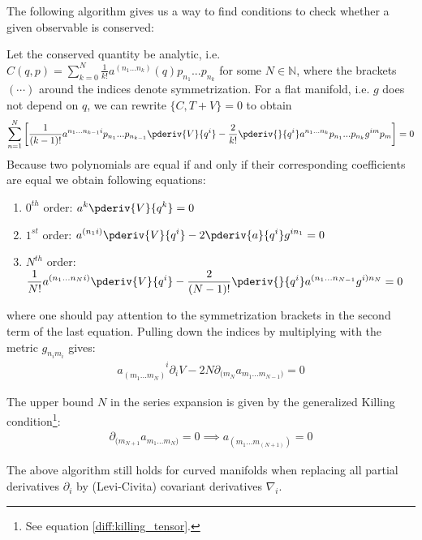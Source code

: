	
	The following algorithm gives us a way to find conditions to check whether a given observable is conserved:
	\begin{method}
		Let the conserved quantity be analytic, i.e. $C(q, p) = \sum_{k=0}^N\frac{1}{k!}a^{(n_1...n_k)}(q)p_{n_1}...p_{n_k}$ for some $N\in\mathbb{N}$, where the brackets $(\cdots)$ around the indices denote symmetrization. For a flat manifold, i.e. $g$ does not depend on $q$, we can rewrite $\{C, T+V\} = 0$ to obtain
		\[
			\sum_{n = 1}^N\left[\frac{1}{(k-1)!}a^{n_1...n_{k-1}i}p_{n_1}...p_{n_{k-1}}\pderiv{V}{q^i} - \frac{2}{k!}\pderiv{}{q^i}a^{n_1...n_k}p_{n_1}...p_{n_k}g^{im}p_m\right] = 0
		\]
		Because two polynomials are equal if and only if their corresponding coefficients are equal we obtain following equations:
		\begin{enumerate}
			\item $0^{th}$ order: $\displaystyle a^k\pderiv{V}{q^k} = 0$
			\item $1^{st}$ order: $\displaystyle a^{(n_1i)}\pderiv{V}{q^i} - 2\pderiv{a}{q^i}g^{in_1} = 0$
			\item $N^{th}$ order: $\displaystyle \frac{1}{N!}a^{(n_1...n_Ni)}\pderiv{V}{q^i} - \frac{2}{(N-1)!}\pderiv{}{q^i}a^{(n_1...n_{N-1}}g^{i)n_N} = 0$
		\end{enumerate}
		where one should pay attention to the symmetrization brackets in the second term of the last equation. Pulling down the indices by multiplying with the metric $g_{n_im_i}$ gives:
		\begin{gather}
			a_{(m_1...m_N)}^{\phantom{(m_1...m_N)}i}\partial_iV - 2N\partial_{(m_N}a_{m_1...m_{N-1})} = 0
		\end{gather}
		
		The upper bound $N$ in the series expansion is given by the generalized Killing condition\footnote{See equation \ref{diff:killing_tensor}.}:
		\begin{gather}
			\partial_{(m_{N+1}}a_{m_1...m_N)} = 0\implies a_{(m_1...m_(N+1))} = 0
		\end{gather}
	\end{method}
	\begin{remark}
		The above algorithm still holds for curved manifolds when replacing all partial derivatives $\partial_i$ by (Levi-Civita) covariant derivatives $\nabla_i$.
	\end{remark}
	
